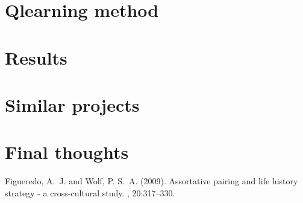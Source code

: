\documentclass[twoside,twocolumn]{article}
\begin{document}
\section{Qlearning method}
\section{Results}
\section{Similar projects}
\section{Final thoughts}


\begin{thebibliography}{99} %

Figueredo, A.~J. and Wolf, P. S.~A. (2009).
\newblock Assortative pairing and life history strategy - a cross-cultural
  study.
, 20:317--330.
 
\end{thebibliography}

\end{document}
